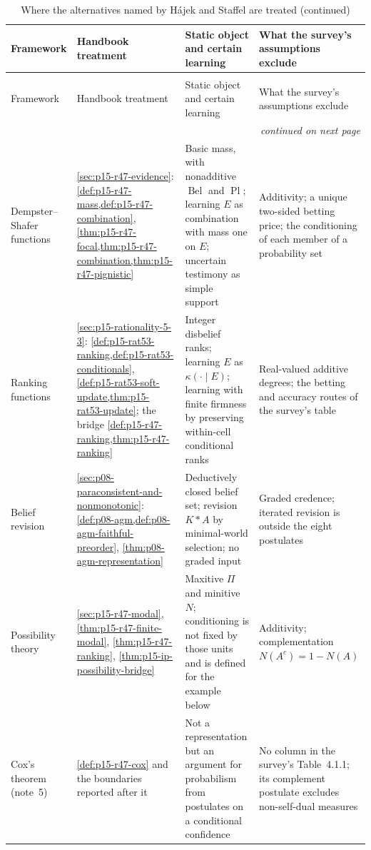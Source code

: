 \begin{longtable}{@{}p{.16\linewidth}p{.24\linewidth}p{.24\linewidth}p{.24\linewidth}@{}}
\caption{Where the alternatives named by H\'ajek and Staffel are treated.}
\label{tab:p15-w02b-p15-022-alternatives}\\
\toprule Framework & Handbook treatment & Static object and certain learning & What the survey's assumptions exclude \\
\midrule\endfirsthead
\caption[]{Where the alternatives named by H\'ajek and Staffel are treated (continued)}\\
\toprule Framework & Handbook treatment & Static object and certain learning & What the survey's assumptions exclude \\
\midrule\endhead
\midrule\multicolumn{4}{r}{\emph{continued on next page}}\\
\endfoot
\endlastfoot
Dempster--Shafer functions &
\cref{sec:p15-r47-evidence}: \cref{def:p15-r47-mass,def:p15-r47-combination},
\cref{thm:p15-r47-focal,thm:p15-r47-combination,thm:p15-r47-pignistic} &
Basic mass, with nonadditive \(\operatorname{Bel}\) and
\(\operatorname{Pl}\); learning \(E\) as combination with mass one on
\(E\); uncertain testimony as simple support &
Additivity; a unique two-sided betting price; the conditioning of each
member of a probability set \\
Ranking functions &
\cref{sec:p15-rationality-5-3}: \cref{def:p15-rat53-ranking,def:p15-rat53-conditionals},
\cref{def:p15-rat53-soft-update,thm:p15-rat53-update}; the bridge
\cref{def:p15-r47-ranking,thm:p15-r47-ranking} &
Integer disbelief ranks; learning \(E\) as \(\kappa(\cdot\mid E)\); learning
with finite firmness by preserving within-cell conditional ranks &
Real-valued additive degrees; the betting and accuracy routes of the
survey's table \\
Belief revision &
\cref{sec:p08-paraconsistent-and-nonmonotonic}:
\cref{def:p08-agm,def:p08-agm-faithful-preorder},
\cref{thm:p08-agm-representation} &
Deductively closed belief set; revision \(K*A\) by minimal-world
selection; no graded input &
Graded credence; iterated revision is outside the eight postulates \\
Possibility theory &
\cref{sec:p15-r47-modal}, \cref{thm:p15-r47-finite-modal},
\cref{thm:p15-r47-ranking}, \cref{thm:p15-ip-possibility-bridge} &
Maxitive \(\Pi\) and minitive \(N\); conditioning is not fixed by those
units and is defined for the example below &
Additivity; complementation \(N(A^c)=1-N(A)\) \\
Cox's theorem (note~5) &
\cref{def:p15-r47-cox} and the boundaries reported after it &
Not a representation but an argument for probabilism from postulates on a
conditional confidence &
No column in the survey's Table~4.1.1; its complement postulate excludes
non-self-dual measures \\
\bottomrule
\end{longtable}

